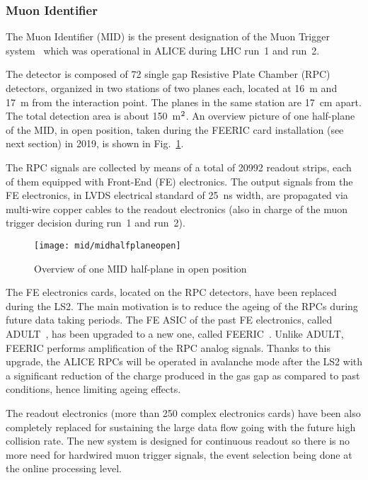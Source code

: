 \subsubsection{Muon Identifier}

The Muon Identifier (MID) is the present designation of the Muon Trigger system~\cite{Aamodt:2008zz} which was operational in ALICE during LHC run~1 and run~2. 

The detector is composed of 72 single gap Resistive Plate Chamber (RPC) detectors, organized in two stations of two planes each, located at 16~m and 17~m from 
the interaction point. The planes in the same station are 17~cm apart. The total detection area is about 150~m$^{\rm 2}$. An overview picture of one half-plane of the MID, in open position, taken during the FEERIC card 
installation (see next section) in 2019, is shown in Fig.~\ref{midhalfplaneopen}.

The RPC signals are collected by means of a total of 20992 readout strips, each of them equipped with Front-End (FE) electronics. The output signals from the FE electronics, in LVDS electrical standard of 25~ns width, 
are propagated via multi-wire copper cables to the readout electronics (also in charge of the muon trigger decision during run~1 and run~2). 

\begin{figure}
\centering 
\texttt{[image: mid/midhalfplaneopen]}
\caption{Overview of one MID half-plane in open position}
\label{midhalfplaneopen}
\end{figure}

The FE electronics cards, located on the RPC detectors, have been replaced during the LS2. The main motivation is to reduce the ageing of the RPCs during future data taking periods. 
The FE ASIC of the past FE electronics, called ADULT~\cite{mid:ADULT}, has been upgraded to a new one, called FEERIC~\cite{mid:FEERICref1,mid:FEERICref2}.
Unlike ADULT, FEERIC performs amplification of the RPC analog signals. Thanks to this upgrade, the ALICE RPCs will be operated in avalanche 
mode after the LS2 with a significant reduction of the charge produced in the gas gap as compared to past conditions, hence limiting ageing effects.

The readout electronics (more than 250 complex electronics cards) have been also completely replaced for sustaining the large data flow going with the future high collision rate. 
The new system is designed for continuous readout so there is no more need for hardwired muon trigger signals, the event selection being done at the online processing level. 


